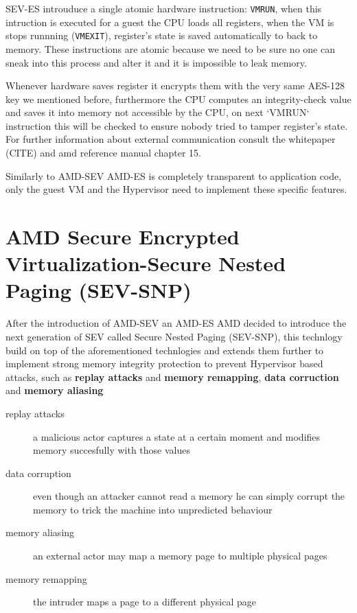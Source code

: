 \documentclass[twocolumn]{article}
\begin{document}
SEV-ES introuduce a single atomic hardware instruction: \texttt{VMRUN}, when this intruction is executed for a guest the CPU loads all registers,
when the VM is stops runnning (\texttt{VMEXIT}), register's state is saved automatically to  back to memory. These instructions are atomic because we need to be sure no one can sneak into this process and alter it and it is impossible to leak memory.

Whenever hardware saves register it encrypts them with the very same AES-128 key we mentioned before, furthermore the CPU computes an integrity-check value and saves it into memory not accessible by the CPU, on next `VMRUN` instruction this will be checked to ensure nobody tried to tamper register's state. For further information about external communication consult the whitepaper (CITE) and amd reference manual chapter 15.

Similarly to AMD-SEV AMD-ES is completely transparent to application code, only the guest VM and the Hypervisor need to implement these specific features.

\section{AMD Secure Encrypted Virtualization-Secure Nested Paging (SEV-SNP)}

After the introduction of AMD-SEV an AMD-ES AMD decided to introduce the next generation of SEV called Secure Nested Paging (SEV-SNP), this technlogy build on top of the aforementioned technlogies and extends them further to implement strong memory integrity protection to prevent Hypervisor based attacks, such as \textbf{replay attacks} and \textbf{memory remapping}, \textbf{data corruction} and \textbf{memory aliasing}

\begin{description}
    \item[replay attacks] a malicious actor captures a state at a certain moment and modifies memory succesfully with those values
    \item[data corruption]  even though an attacker cannot read a memory he can simply corrupt the memory to trick the machine into unpredicted behaviour
    \item[memory aliasing]  an external actor may map a memory page to multiple physical pages
    \item[memory remapping]  the intruder maps a page to a different physical page
\end{description}
\end{document}
